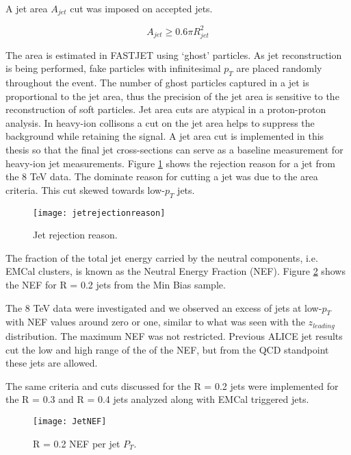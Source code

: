 A jet area $A_{jet}$ cut was imposed on accepted jets.

\begin{equation}
A_{jet} \geq 0.6 \pi R_{jet}^{2}
\label{eq:AreaJet}
\end{equation}

\noindent
The area is estimated in FASTJET using `ghost' particles.  As jet reconstruction is being performed, fake particles with infinitesimal $p_{T}$ are placed randomly throughout the event.  The number of ghost particles captured in a jet is proportional to the jet area, thus the precision of the jet area is sensitive to the reconstruction of soft particles.  Jet area cuts are atypical in a proton-proton analysis.  In heavy-ion collisons a cut on the jet area helps to suppress the background while retaining the signal.  A jet area cut is implemented in this thesis so that the final jet cross-sections can serve as a baseline measurement for heavy-ion jet measurements.  Figure \ref{fig:jetRejection} shows the rejection reason for a jet from the 8 TeV data.  The dominate reason for cutting a jet was due to the area criteria.  This cut skewed towards low-$p_{T}$ jets. 

\begin{figure}[t!]
\texttt{[image: jetrejectionreason]}
\centering
\caption{Jet rejection reason.}
\label{fig:jetRejection}
\end{figure}

The fraction of the total jet energy carried by the neutral components, i.e. EMCal clusters, is known as the Neutral Energy Fraction (NEF).  Figure \ref{fig:JetNEF} shows the NEF for R = 0.2 jets from the Min Bias sample.

The 8 TeV data were investigated and we observed an excess of jets at low-$p_{T}$ with NEF values around zero or one, similar to what was seen with the $z_{leading}$ distribution.  The maximum NEF was not restricted.  Previous ALICE jet results cut the low and high range of the of the NEF, but from the QCD standpoint these jets are allowed.

The same criteria and cuts discussed for the R = 0.2 jets were implemented for the R = 0.3 and R = 0.4 jets analyzed along with EMCal triggered jets.

\begin{figure}[h]
\texttt{[image: JetNEF]}
\centering
\caption{R = 0.2 NEF per jet $P_{T}$.}
\label{fig:JetNEF}
\end{figure}




